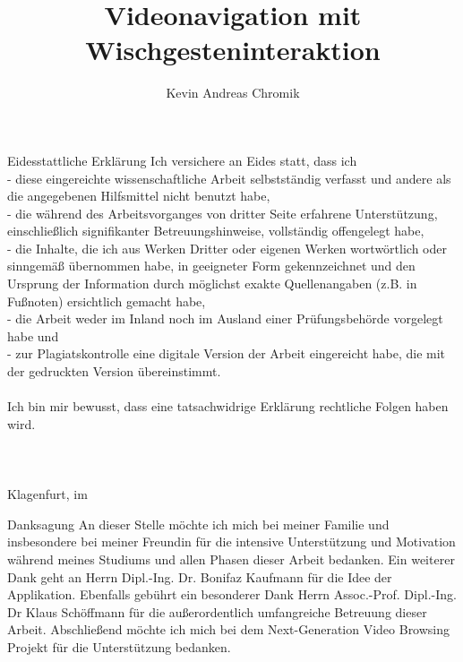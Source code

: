 \documentclass[11pt,a4paper]{report}
\begin{document}
\title{Videonavigation mit Wischgesteninteraktion}
\author{Kevin Andreas Chromik}

\maketitle
{}
\begin{preface}{Eidesstattliche Erklärung}
Ich versichere an Eides statt, dass ich\\
- diese eingereichte wissenschaftliche Arbeit selbstständig verfasst und andere als die angegebenen Hilfsmittel nicht benutzt habe,\\
- die während des Arbeitsvorganges von dritter Seite erfahrene Unterstützung, einschließlich signifikanter Betreuungshinweise, vollständig offengelegt habe,\\
- die Inhalte, die ich aus Werken Dritter oder eigenen Werken wortwörtlich oder sinngemäß übernommen habe, in geeigneter Form gekennzeichnet und den Ursprung der Information durch möglichst exakte Quellenangaben (z.B. in Fußnoten) ersichtlich gemacht habe,\\
- die Arbeit weder im Inland noch im Ausland einer Prüfungsbehörde vorgelegt habe und\\
- zur Plagiatskontrolle eine digitale Version der Arbeit eingereicht habe, die mit der gedruckten Version übereinstimmt.
\\\\Ich bin mir bewusst, dass eine tatsachwidrige Erklärung rechtliche Folgen haben wird.\\\\\\\\Klagenfurt, im \finaldate
\end{preface}

\begin{preface}{Danksagung}
An dieser Stelle möchte ich mich bei meiner Familie und insbesondere bei meiner Freundin für die intensive Unterstützung und Motivation während meines Studiums und allen Phasen dieser Arbeit bedanken. Ein weiterer Dank geht an Herrn Dipl.-Ing. Dr. Bonifaz Kaufmann für die Idee der Applikation. Ebenfalls gebührt ein besonderer Dank Herrn Assoc.-Prof. Dipl.-Ing. Dr Klaus Schöffmann für die außerordentlich umfangreiche Betreuung dieser Arbeit.  Abschließend möchte ich mich bei dem Next-Generation Video Browsing Projekt für die Unterstützung bedanken.
\end{preface}
\end{document}
